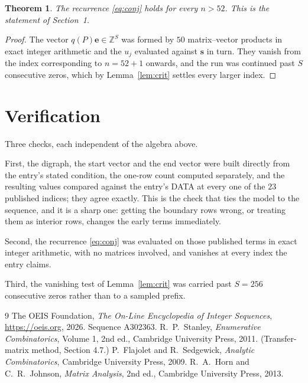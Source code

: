 \documentclass[11pt,a4paper]{article}
\theoremstyle{plain}
\newtheorem{theorem}{Theorem}
\theoremstyle{definition}
\begin{document}
\begin{theorem}
The recurrence \eqref{eq:conj} holds for every $n>52$. This is the statement of
Section~1.
\end{theorem}

\begin{proof}
The vector $q(P)\mathbf{e}\in\mathbb{Z}^{S}$ was formed by $50$ matrix--vector
products in exact integer arithmetic and the $u_j$ evaluated against $\mathbf{s}$ in turn.
They vanish from the index corresponding to $n=52+1$ onwards, and the run was continued
past $S$ consecutive zeros, which by Lemma~\ref{lem:crit} settles every larger index.
\end{proof}

\section{Verification}

Three checks, each independent of the algebra above.

First, the digraph, the start vector and the end vector were built directly from the
entry's stated condition, the one-row count computed separately, and the resulting values
compared against the entry's DATA at every one of the $23$ published indices; they
agree exactly. This is the check that ties the model to the sequence, and it is a sharp one:
getting the boundary rows wrong, or treating them as interior rows, changes the early terms
immediately.

Second, the recurrence \eqref{eq:conj} was evaluated on those published terms in exact
integer arithmetic, with no matrices involved, and vanishes at every index the entry claims.

Third, the vanishing test of Lemma~\ref{lem:crit} was carried past $S=256$ consecutive
zeros rather than to a sampled prefix.

\begin{thebibliography}{9}
 The OEIS Foundation, \emph{The On-Line Encyclopedia of Integer
Sequences}, \url{https://oeis.org}, 2026. Sequence A302363.
 R.~P.~Stanley, \emph{Enumerative Combinatorics}, Volume 1, 2nd ed.,
Cambridge University Press, 2011. (Transfer-matrix method, Section 4.7.)
 P.~Flajolet and R.~Sedgewick, \emph{Analytic Combinatorics}, Cambridge
University Press, 2009.
 R.~A.~Horn and C.~R.~Johnson, \emph{Matrix Analysis}, 2nd ed., Cambridge
University Press, 2013.
\end{thebibliography}
\end{document}
